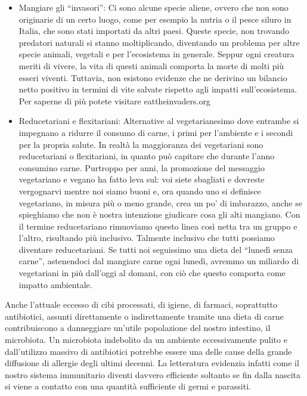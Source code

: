 \documentclass[12pt]{book} %
\begin{document}
\begin{itemize}
\item Mangiare gli “invasori”: Ci sono alcune specie aliene, ovvero che non sono originarie di un certo luogo, come
per esempio la nutria o il pesce siluro in Italia, che sono stati importati da altri paesi. Queste specie, non
trovando predatori naturali si stanno moltiplicando, diventando un problema per altre specie animali, vegetali e
per l'ecosistema in generale. Seppur ogni creatura meriti di vivere, la vita di questi
animali comporta la morte di molti più esseri viventi. Tuttavia, non esistono evidenze che ne derivino un bilancio netto positivo in termini di vite salvate rispetto agli impatti sull’ecosistema. Per saperne di più potete visitare eattheinvaders.org
\item Reducetariani e flexitariani: Alternative al vegetarianesimo dove entrambe si impegnano a ridurre il consumo di carne, i primi per l'ambiente e i secondi per la propria salute. In realtà la maggioranza dei vegetariani sono reducetariani o flexitariani, in quanto può capitare che durante l'anno consumino carne. Purtroppo per anni, la promozione del
messaggio vegetariano e vegano ha fatto leva sul: voi siete sbagliati e dovreste vergognarvi mentre noi siamo buoni e,
ora quando uno si definisce vegetariano, in misura più o meno grande, crea un po' di imbarazzo, anche se
spieghiamo che non è nostra intenzione giudicare cosa gli alti mangiano. Con il termine reducetariano rimuoviamo questo
linea così netta tra un gruppo e l'altro, risultando più inclusivo. Talmente inclusivo che tutti
possiamo diventare reducetariani. Se tutti noi seguissimo una dieta del “lunedì senza carne”, astenendoci dal mangiare
carne ogni lunedì, avremmo un miliardo di vegetariani in più dall'oggi al domani, con ciò che questo comporta come impatto ambientale.
\end{itemize}

\begin{mdframed}[linewidth=1pt]
Anche l'attuale eccesso di cibi processati, di igiene, di farmaci, soprattutto antibiotici, assunti
direttamente o indirettamente tramite una dieta di carne contribuiscono a danneggiare un'utile popolazione
del nostro intestino, il microbiota. Un microbiota indebolito da un ambiente eccessivamente pulito e
dall'utilizzo massivo di antibiotici potrebbe essere una delle cause della grande diffusione di
allergie degli ultimi decenni. La letteratura evidenzia infatti come il nostro sistema immunitario diventi davvero
efficiente soltanto se fin dalla nascita si viene a contatto con una quantità sufficiente di germi e parassiti. 
\end{mdframed}
\end{document}
